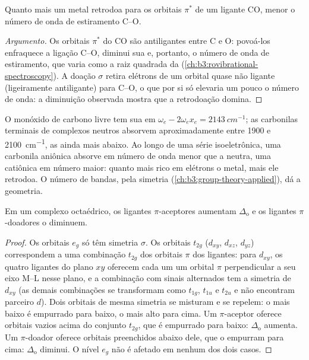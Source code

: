 \begin{proposition}\label{prop:b3:organometallic-bonding:co-frequency}
Quanto mais um metal retrodoa para os orbitais $\pi^*$ de um ligante CO, menor o
número de onda de estiramento C--O.
\end{proposition}

\begin{proof}[Argumento]
Os orbitais $\pi^*$ do CO são antiligantes entre C e O: povoá-los enfraquece a
ligação C--O, diminui sua  e, portanto, o número de onda de estiramento, que
varia como a raiz quadrada da  (\cref{ch:b3:rovibrational-spectroscopy}).
A doação $\sigma$ retira elétrons de um orbital quase não ligante (ligeiramente
antiligante) para C--O, o que por si só elevaria um pouco o número de onda: a
diminuição observada mostra que a retrodoação domina.
\end{proof}

O monóxido de carbono livre tem sua  em $\omega_e - 2\omega_ex_e = \qty{2143}{cm^{-1}}$; as carbonilas
terminais de complexos neutros absorvem aproximadamente entre 1900 e \qty{2100}{cm^{-1}},
as  ainda mais abaixo. Ao longo de uma série isoeletrônica, uma carbonila
aniônica absorve em número de onda menor que a neutra, uma catiônica em número
maior: quanto mais rico em elétrons o metal, mais ele retrodoa. O número de
bandas, pela simetria (\cref{ch:b3:group-theory-applied}), dá a geometria.

\begin{proposition}\label{prop:b3:organometallic-bonding:pi-delta}
Em um complexo octaédrico, os ligantes $\pi$-aceptores aumentam $\Delta_{\mathrm o}$ e os ligantes $\pi$-doadores
o diminuem.
\end{proposition}

\begin{proof}
Os orbitais $e_g$ só têm simetria $\sigma$. Os orbitais $t_{2g}$ ($d_{xy}$, $d_{xz}$, $d_{yz}$) correspondem a uma combinação $t_{2g}$
dos orbitais $\pi$ dos ligantes: para $d_{xy}$, os quatro ligantes do plano $xy$ oferecem cada um
um orbital $\pi$ perpendicular a seu eixo M--L nesse plano, e a
combinação com sinais alternados tem a simetria de $d_{xy}$ (as demais
combinações se transformam como $t_{1g}$, $t_{1u}$ e $t_{2u}$ e não encontram parceiro $d$). Dois orbitais de
mesma simetria se misturam e se repelem: o mais baixo é empurrado para baixo, o mais alto para cima. Um
$\pi$-aceptor oferece orbitais vazios acima do conjunto $t_{2g}$, que é empurrado para baixo: $\Delta_{\mathrm o}$
aumenta. Um $\pi$-doador oferece orbitais preenchidos abaixo dele, que o empurram para cima: $\Delta_{\mathrm o}$
diminui. O nível $e_g$ não é afetado em nenhum dos dois casos.
\end{proof}

